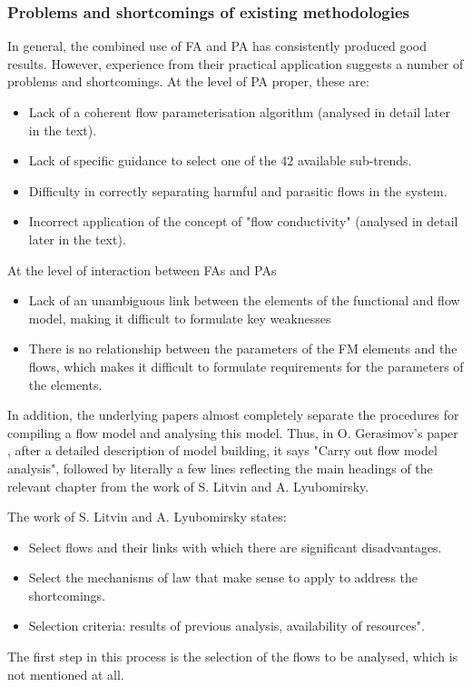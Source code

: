 \documentclass[a4paper,11pt]{article}
\begin{document}
\subsubsection*{Problems and shortcomings of existing methodologies}

In general, the combined use of FA and PA has consistently produced good
results. However, experience from their practical application suggests a
number of problems and shortcomings. At the level of PA proper, these are:
\begin{itemize}
\item Lack of a coherent flow parameterisation algorithm (analysed in detail
  later in the text).
\item Lack of specific guidance to select one of the 42 available sub-trends. 
\item Difficulty in correctly separating harmful and parasitic flows in the
  system.
\item Incorrect application of the concept of "flow conductivity" (analysed in
  detail later in the text).
\end{itemize}
At the level of interaction between FAs and PAs
\begin{itemize}
\item Lack of an unambiguous link between the elements of the functional and
  flow model, making it difficult to formulate key weaknesses
\item There is no relationship between the parameters of the FM elements and
  the flows, which makes it difficult to formulate requirements for the
  parameters of the elements.
\end{itemize}
In addition, the underlying papers almost completely separate the procedures
for compiling a flow model and analysing this model. Thus, in O. Gerasimov's
paper \cite{B9}, after a detailed description of model building, it says
"Carry out flow model analysis", followed by literally a few lines reflecting
the main headings of the relevant chapter from the work of S. Litvin and
A. Lyubomirsky.

The work of S. Litvin and A. Lyubomirsky \cite{B6} states:
\begin{itemize}
\item Select flows and their links with which there are significant
  disadvantages.
\item Select the mechanisms of law that make sense to apply to address the
  shortcomings.
\item Selection criteria: results of previous analysis, availability of
  resources".
\end{itemize}
The first step in this process is the selection of the flows to be analysed,
which is not mentioned at all.
\end{document}
